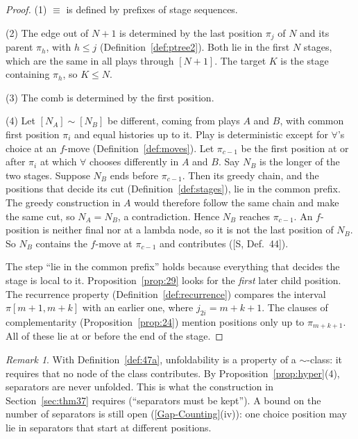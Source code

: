 \documentclass[11pt]{article}
\newcommand{\iv}[2]{\pi[#1,#2]}
\theoremstyle{plain}
\theoremstyle{definition}
\theoremstyle{remark}
\newtheorem{remark}[theorem]{Remark}
\newcommand{\GapCounting}{\hyperref[gap:count]{[Gap-Counting]}}
\begin{document}
\begin{proof}
(1) $\equiv$ is defined by prefixes of stage sequences.

(2) The edge out of $N+1$ is determined by the last position $\pi_j$ of
$N$ and its parent $\pi_h$, with $h\le j$
(Definition~\ref{def:ptree2}).  Both lie in the first $N$ stages,
which are the same in all plays through $[N+1]$.  The target $K$ is
the stage containing $\pi_h$, so $K\le N$.

(3) The comb is determined by the first position.

(4) Let $[N_A]\sim[N_B]$ be different, coming from plays $A$
and $B$, with common first position $\pi_i$ and equal histories up to
it.  Play is deterministic except for $\forall$'s choice at an
$f$-move (Definition~\ref{def:moves}).  Let $\pi_{c-1}$ be the first
position at or after $\pi_i$ at which $\forall$ chooses differently in $A$
and $B$.  Say $N_B$ is the longer of the two stages.  Suppose $N_B$
ends before $\pi_{c-1}$.  Then its greedy chain, and the positions that
decide its cut (Definition~\ref{def:stages}), lie in the common prefix.
The greedy construction in $A$ would therefore follow the same chain
and make the same cut, so $N_A=N_B$, a contradiction.  Hence $N_B$
reaches $\pi_{c-1}$.  An $f$-position is neither final nor at a lambda
node, so it is not the last position of $N_B$.  So $N_B$ contains the
$f$-move at $\pi_{c-1}$ and contributes ([S, Def.~44]).

The step ``lie in the common prefix'' holds because everything that
decides the stage is local to it.  Proposition~\ref{prop:29} looks for
the \emph{first} later child position.  The recurrence property
(Definition~\ref{def:recurrence}) compares the interval
$\iv{m+1}{m+k}$ with an earlier one, where $j_{2i}=m+k+1$.  The clauses
of complementarity (Proposition~\ref{prop:24}) mention positions only
up to $\pi_{m+k+1}$.  All of these lie at or before the end of the
stage.
\end{proof}

\begin{remark}
With Definition~\ref{def:47a}, unfoldability is a property of a
$\sim$-class: it requires that no node of the class contributes.  By
Proposition~\ref{prop:hyper}(4), separators are never unfolded.  This is
what the construction in Section~\ref{sec:thm37} requires (``separators
must be kept'').  A bound on the number of separators is still open
(\GapCounting{}(iv)): one choice position may lie in separators
that start at different positions.
\end{remark}
\end{document}
